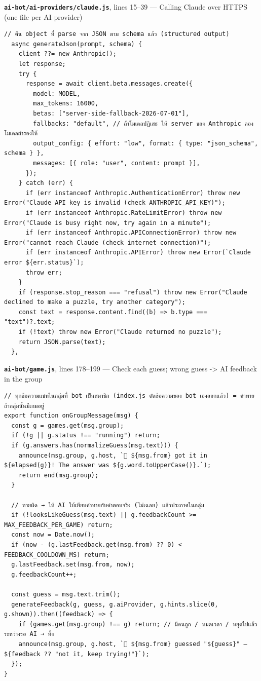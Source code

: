\documentclass[11pt,a4paper]{article}
\newcommand{\code}[1]{\texttt{#1}}
\newcommand{\snap}[3]{\par\medskip\textbf{\code{#1}}, lines #2 --- #3}
\begin{document}
\snap{ai-bot/ai-providers/claude.js}{15--39}{Calling Claude over HTTPS (one file per AI provider)}
\begin{Verbatim}[firstnumber=15]
  // คืน object ที่ parse จาก JSON ตาม schema แล้ว (structured output)
  async generateJson(prompt, schema) {
    client ??= new Anthropic();
    let response;
    try {
      response = await client.beta.messages.create({
        model: MODEL,
        max_tokens: 16000,
        betas: ["server-side-fallback-2026-07-01"],
        fallbacks: "default", // ถ้าโมเดลปฏิเสธ ให้ server ของ Anthropic ลองโมเดลสำรองให้
        output_config: { effort: "low", format: { type: "json_schema", schema } },
        messages: [{ role: "user", content: prompt }],
      });
    } catch (err) {
      if (err instanceof Anthropic.AuthenticationError) throw new Error("Claude API key is invalid (check ANTHROPIC_API_KEY)");
      if (err instanceof Anthropic.RateLimitError) throw new Error("Claude is busy right now, try again in a minute");
      if (err instanceof Anthropic.APIConnectionError) throw new Error("cannot reach Claude (check internet connection)");
      if (err instanceof Anthropic.APIError) throw new Error(`Claude error ${err.status}`);
      throw err;
    }
    if (response.stop_reason === "refusal") throw new Error("Claude declined to make a puzzle, try another category");
    const text = response.content.find((b) => b.type === "text")?.text;
    if (!text) throw new Error("Claude returned no puzzle");
    return JSON.parse(text);
  },
\end{Verbatim}

\snap{ai-bot/game.js}{178--199}{Check each guess; wrong guess -> AI feedback in the group}
\begin{Verbatim}[firstnumber=178]
// ทุกข้อความแชทในกลุ่มที่ bot เป็นสมาชิก (index.js ตัดข้อความของ bot เองออกแล้ว) = คำทาย ถ้ากลุ่มนั้นมีเกมอยู่
export function onGroupMessage(msg) {
  const g = games.get(msg.group);
  if (!g || g.status !== "running") return;
  if (g.answers.has(normalizeGuess(msg.text))) {
    announce(msg.group, g.host, `🎉 ${msg.from} got it in ${elapsed(g)}! The answer was ${g.word.toUpperCase()}.`);
    return end(msg.group);
  }

  // ทายผิด → ให้ AI ใบ้เทียบคำทายกับคำตอบจริง (ไม่เฉลย) แล้วประกาศในกลุ่ม
  if (!looksLikeGuess(msg.text) || g.feedbackCount >= MAX_FEEDBACK_PER_GAME) return;
  const now = Date.now();
  if (now - (g.lastFeedback.get(msg.from) ?? 0) < FEEDBACK_COOLDOWN_MS) return;
  g.lastFeedback.set(msg.from, now);
  g.feedbackCount++;

  const guess = msg.text.trim();
  generateFeedback(g, guess, g.aiProvider, g.hints.slice(0, g.shown)).then((feedback) => {
    if (games.get(msg.group) !== g) return; // มีคนถูก / หมดเวลา / หยุดไปแล้วระหว่างรอ AI → ทิ้ง
    announce(msg.group, g.host, `💬 ${msg.from} guessed "${guess}" — ${feedback ?? "not it, keep trying!"}`);
  });
}
\end{Verbatim}
\end{document}
